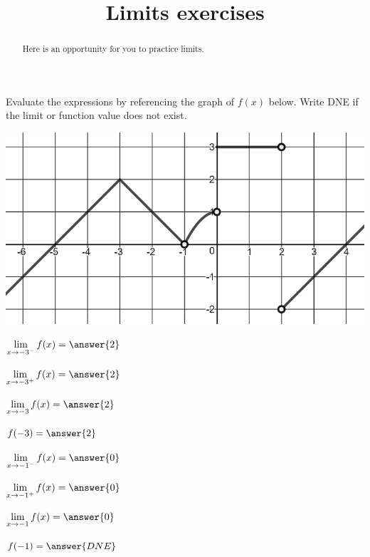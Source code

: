 \documentclass[handout]{ximera}
\title{Limits exercises}
\begin{document}
\begin{abstract}
Here is an opportunity for you to practice limits.
\end{abstract}
\maketitle

\begin{exercise}
  Evaluate the expressions by referencing the graph of $f(x)$ below. Write DNE if the limit or function value does not exist.
  
\begin{center} \includegraphics[scale=0.5]{limgraph.png} \end{center}

\begin{enumerate}

\begin{multicols}{3}
\item [] $\displaystyle\lim_{x\to -3^-} f(x) =\answer{2}$  

\item [] $\displaystyle\lim_{x\to -3^+} f(x) = \answer{2}$ 

\item [] $\displaystyle\lim_{x\to -3} f(x) = \answer{2}$ 

\item [] $f(-3) = \answer{2}$

\item [] $\displaystyle\lim_{x\to -1^-} f(x) =\answer{0}$ 

\item [] $\displaystyle\lim_{x\to -1^+} f(x) = \answer{0}$ 

\item [] $\displaystyle\lim_{x\to -1} f(x) = \answer{0}$ 

\item [] $f(-1) = \answer{DNE}$


\end{multicols}
\end{enumerate}
\end{exercise}
\end{document}
